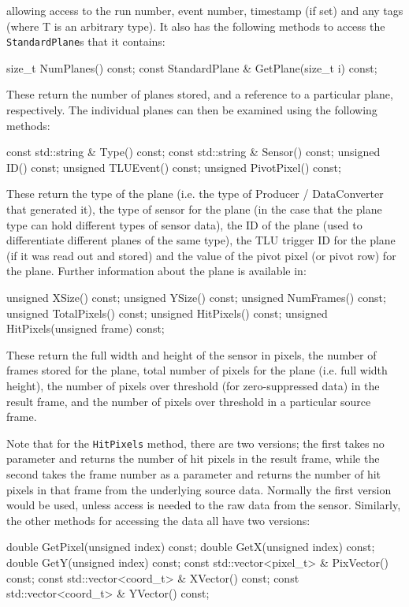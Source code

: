 allowing access to the run number, event number, timestamp (if set) and any tags (where T is an arbitrary type).
It also has the following methods to access the \texttt{StandardPlane}s that it contains:
\begin{listing}
size_t NumPlanes() const;
const StandardPlane & GetPlane(size_t i) const;
\end{listing}

These return the number of planes stored, and a reference to a particular plane, respectively.
The individual planes can then be examined using the following methods:
\begin{listing}
const std::string & Type() const;
const std::string & Sensor() const;
unsigned ID() const;
unsigned TLUEvent() const;
unsigned PivotPixel() const;
\end{listing}

These return the type of the plane (i.e. the type of Producer / DataConverter that generated it),
the type of sensor for the plane (in the case that the plane type can hold different types of sensor data),
the ID of the plane (used to differentiate different planes of the same type),
the TLU trigger ID for the plane (if it was read out and stored)
and the value of the pivot pixel (or pivot row) for the plane.
Further information about the plane is available in:
\begin{listing}
unsigned XSize() const;
unsigned YSize() const;
unsigned NumFrames() const;
unsigned TotalPixels() const;
unsigned HitPixels() const;
unsigned HitPixels(unsigned frame) const;
\end{listing}

These return the full width and height of the sensor in pixels,
the number of frames stored for the plane,
total number of pixels for the plane (i.e. full width \x{} height),
the number of pixels over threshold (for zero-suppressed data) in the result frame,
and the number of pixels over threshold in a particular source frame.

Note that for the \texttt{HitPixels} method, there are two versions;
the first takes no parameter and returns the number of hit pixels in the result frame,
while the second takes the frame number as a parameter and returns the number of hit pixels
in that frame from the underlying source data.
Normally the first version would be used, unless access is needed to the raw data from the sensor.
Similarly, the other methods for accessing the data all have two versions:

\begin{listing}
double GetPixel(unsigned index) const;
double GetX(unsigned index) const;
double GetY(unsigned index) const;
const std::vector<pixel_t> & PixVector() const;
const std::vector<coord_t> & XVector() const;
const std::vector<coord_t> & YVector() const;
\end{listing}

